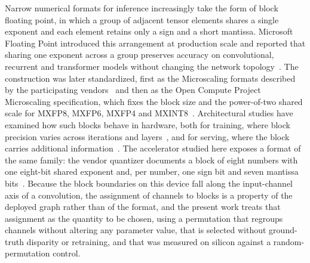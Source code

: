 %
%
%

Narrow numerical formats for inference increasingly take the form of block
floating point, in which a group of adjacent tensor elements shares a single
exponent and each element retains only a sign and a short mantissa. Microsoft
Floating Point introduced this arrangement at production scale and reported
that sharing one exponent across a group preserves accuracy on convolutional,
recurrent and transformer models without changing the network
topology~\cite{rbq_rouhani2020msfp}. The construction was later standardized,
first as the Microscaling formats described by the participating
vendors~\cite{rbq_rouhani2023microscaling} and then as the Open Compute Project
Microscaling specification, which fixes the block size and the power-of-two
shared scale for MXFP8, MXFP6, MXFP4 and MXINT8~\cite{rbq_ocp2023mx}.
Architectural studies have examined how such blocks behave in hardware, both
for training, where block precision varies across iterations and
layers~\cite{rbq_zhang2022fast}, and for serving, where the block carries
additional information~\cite{rbq_lee2025mxplus}. The accelerator studied here
exposes a format of the same family: the vendor quantizer documents a block of
eight numbers with one eight-bit shared exponent and, per number, one sign bit
and seven mantissa bits~\cite{rbq_amdquarkbfp16}. Because the block boundaries
on this device fall along the input-channel axis of a convolution, the
assignment of channels to blocks is a property of the deployed graph rather
than of the format, and the present work treats that assignment as the quantity
to be chosen, using a permutation that regroups channels without altering any
parameter value, that is selected without ground-truth disparity or retraining,
and that was measured on silicon against a random-permutation control.

